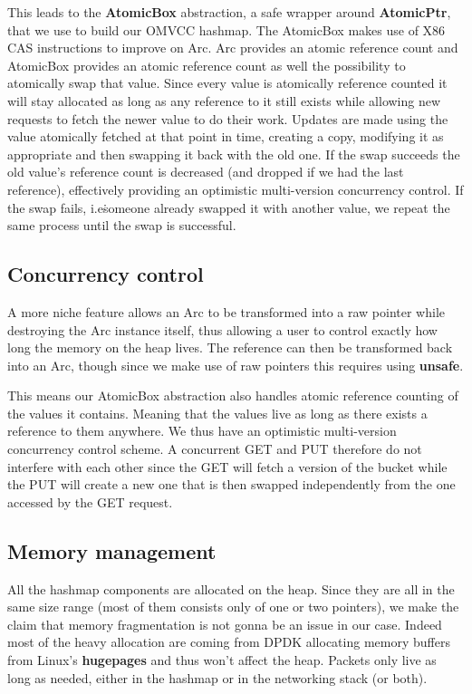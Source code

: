 \documentclass[11pt]{article}
\begin{document}
This leads to the \textbf{AtomicBox} abstraction, a safe wrapper
around \textbf{AtomicPtr}, that we use to build our OMVCC hashmap.
The AtomicBox makes use of X86 CAS instructions to improve on Arc.
Arc provides an atomic reference count and AtomicBox provides an
atomic reference count as well the possibility to atomically swap that
value. Since every value is atomically reference counted it will stay
allocated as long as any reference to it still exists while allowing
new requests to fetch the newer value to do their work. Updates are
made using the value atomically fetched at that point in time,
creating a copy, modifying it as appropriate and then swapping it back
with the old one. If the swap succeeds the old value's reference count
is decreased (and dropped if we had the last reference), effectively
providing an optimistic multi-version concurrency control. If the swap
fails, i.e\. someone already swapped it with another value, we repeat
the same process until the swap is successful.

\subsection{Concurrency control}
A more niche feature allows an Arc to be transformed into a
raw pointer while destroying the Arc instance itself, thus allowing
a user to control exactly how long the memory on the heap lives.
The reference can then be transformed back into an Arc, though since
we make use of raw pointers this requires using \textbf{unsafe}.

This means our AtomicBox abstraction also handles atomic reference
counting of the values it contains. Meaning that the values live as
long as there exists a reference to them anywhere. We thus have an
optimistic multi-version concurrency control scheme. A concurrent GET
and PUT therefore do not interfere with each other since the GET will
fetch a version of the bucket while the PUT will create a new one that
is then swapped independently from the one accessed by the GET
request.

\subsection{Memory management}
All the hashmap components are allocated on the heap. Since they are
all in the same size range (most of them consists only of one or two
pointers), we make the claim that memory fragmentation is not gonna be
an issue in our case. Indeed most of the heavy allocation are coming
from DPDK allocating memory buffers from Linux's \textbf{hugepages}
and thus won't affect the heap. Packets only live as long as needed,
either in the hashmap or in the networking stack (or both).
\end{document}
